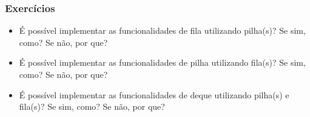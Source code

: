 \documentclass{beamer}
\begin{document}
\begin{frame}

  \frametitle{Exercícios}

  \begin{itemize}

    \item É possível implementar as funcionalidades de fila utilizando pilha(s)?
      Se sim, como? Se não, por que?

    \item É possível implementar as funcionalidades de pilha utilizando fila(s)?
      Se sim, como? Se não, por que?

    \item É possível implementar as funcionalidades de deque utilizando pilha(s)
      e fila(s)?  Se sim, como? Se não, por que?

  \end{itemize}
\end{frame}



\end{document}
